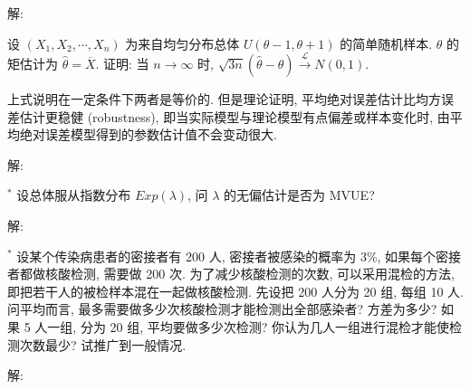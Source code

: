 \documentclass[standard]{ExBook}
\begin{document}
\begin{qitems}
\vspace{-5em}

    \begin{bbox}
解: 
    \end{bbox}

\vspace{-5em}

    \begin{bbox}
    \begin{shaded}
        \qitem
设 \((X_1, X_2, \cdots, X_n)\) 为来自均匀分布总体 \(U(\theta - 1, \theta + 1)\) 的简单随机样本. \(\theta\) 的矩估计为 \(\hat{\theta} = \overline{X}\). 证明: 当 \(n \to \infty\) 时, \(\sqrt{3n}(\hat{\theta} - \theta) \overset{\mathcal{L}}{\longrightarrow} N(0, 1)\).

上式说明在一定条件下两者是等价的. 但是理论证明, 平均绝对误差估计比均方误差估计更稳健 (robustness), 即当实际模型与理论模型有点偏差或样本变化时, 由平均绝对误差模型得到的参数估计值不会变动很大.
    \end{shaded}
    \end{bbox}

\vspace{-5em}

    \begin{bbox}
解: 
    \end{bbox}

\vspace{-5em}

    \begin{bbox}
    \begin{shaded}
        \qitem$^*$
设总体服从指数分布 \(Exp(\lambda)\), 问 \(\lambda\) 的无偏估计是否为 MVUE?
    \end{shaded}
    \end{bbox}

\vspace{-5em}

    \begin{bbox}
解: 
    \end{bbox}

\vspace{-5em}

    \begin{bbox}
    \begin{shaded}
        \qitem$^*$
设某个传染病患者的密接者有 200 人, 密接者被感染的概率为 3\%, 如果每个密接者都做核酸检测, 需要做 200 次. 为了减少核酸检测的次数, 可以采用混检的方法, 即把若干人的被检样本混在一起做核酸检测. 先设把 200 人分为 20 组, 每组 10 人. 问平均而言, 最多需要做多少次核酸检测才能检测出全部感染者? 方差为多少? 如果 5 人一组, 分为 20 组, 平均要做多少次检测? 你认为几人一组进行混检才能使检测次数最少? 试推广到一般情况.
    \end{shaded}
    \end{bbox}

\vspace{-5em}

    \begin{bbox}
解: 
    \end{bbox}
\end{qitems}
\end{document}
